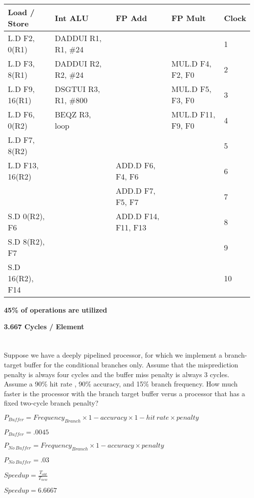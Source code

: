 \documentclass{article}
\begin{document}
\begin{tabular}{|l|l|l|l|l|}
\hline
Load / Store & Int ALU & FP Add & FP Mult & Clock\\
\hline
L.D F2, 0(R1) &DADDUI R1, R1, \#24  & & & 1\\
L.D F3, 8(R1) &DADDUI R2, R2, \#24 & & MUL.D F4, F2, F0 & 2\\
L.D F9, 16(R1) & DSGTUI R3, R1, \#800& & MUL.D F5, F3, F0 &  3  \\
L.D F6, 0(R2) &BEQZ R3, loop    & & MUL.D F11, F9, F0 & 4\\
L.D F7, 8(R2) &  & & & 5\\
L.D F13, 16(R2) &  & ADD.D F6, F4, F6  & & 6\\
&    &  ADD.D F7, F5, F7 & & 7\\
S.D 0(R2), F6 & & ADD.D F14, F11, F13 & & 8\\
S.D 8(R2), F7 & & & & 9 \\
S.D 16(R2), F14 & & & & 10 \\
\hline
\end{tabular}

\vspace{5mm}
\textbf{45\% of operations are utilized} 

\textbf{3.667 Cycles / Element}

\section{}
Suppose we have a deeply pipelined processor, for which we implement a branch-target buffer for the conditional branches only. Assume that the misprediction penalty is always four cycles and the buffer miss penalty is always 3 cycles. Assume a 90\% hit rate , 90\% accuracy, and 15\% branch frequency. How much faster is the processor with the branch target buffer verus a processor that has a fixed two-cycle branch penalty?

\vspace{5mm}
$P_{Buffer}=Frequency_{Branch}\times{1-accuracy}\times{1-hit\ rate}\times{penalty}$

$P_{Buffer}=.0045$ 

\vspace{5mm}
$P_{No\ Buffer}=Frequency_{Branch}\times{1-accuracy}\times{penalty}$

$P_{No\ Buffer}=.03$

\vspace{5mm}
$Speed up=\frac{T_{old}}{T_{new}}$

$Speed up=6.6667$
\end{document}
